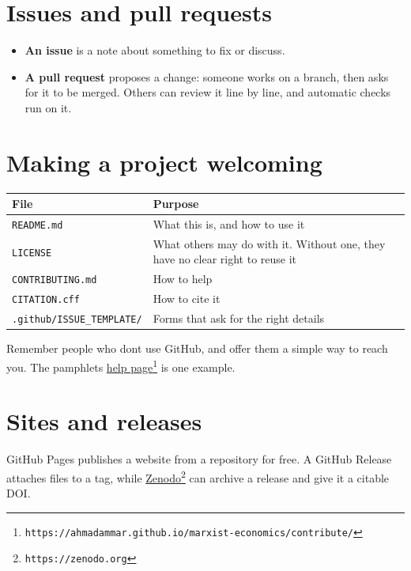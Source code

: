 \section{Issues and pull requests}\label{issues-and-pull-requests}

\begin{itemize}
\tightlist
\item
  \textbf{An issue} is a note about something to fix or discuss.
\item
  \textbf{A pull request} proposes a change: someone works on a branch, then asks for it to be merged. Others can review it line by line, and automatic checks run on it.
\end{itemize}

\section{Making a project welcoming}\label{making-a-project-welcoming}

{\def\LTcaptype{none} %
\begin{longtable}[]{@{}
  >{\raggedright\arraybackslash}p{}
  >{\raggedright\arraybackslash}p{}@{}}
\toprule\noalign{}
\begin{minipage}[b]{\linewidth}\raggedright
File
\end{minipage} & \begin{minipage}[b]{\linewidth}\raggedright
Purpose
\end{minipage} \\
\midrule\noalign{}
\endhead
\bottomrule\noalign{}
\endlastfoot
\texttt{README.md} & What this is, and how to use it \\
\texttt{LICENSE} & What others may do with it. Without one, they have no clear right to reuse it \\
\texttt{CONTRIBUTING.md} & How to help \\
\texttt{CITATION.cff} & How to cite it \\
\texttt{.github/ISSUE\_TEMPLATE/} & Forms that ask for the right details \\
\end{longtable}
}

Remember people who don\textquotesingle t use GitHub, and offer them a simple way to reach you. The pamphlet\textquotesingle s \href{https://ahmadammar.github.io/marxist-economics/contribute/}{help page}\footnote{\texttt{https://ahmadammar.github.io/marxist-economics/contribute/}} is one example.

\section{Sites and releases}\label{sites-and-releases}

GitHub Pages publishes a website from a repository for free. A GitHub Release attaches files to a tag, while \href{https://zenodo.org}{Zenodo}\footnote{\texttt{https://zenodo.org}} can archive a release and give it a citable DOI.

